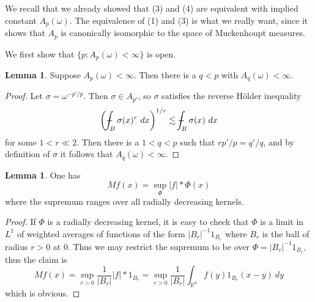 \documentclass[12pt]{book}
\newcommand{\RR}{\mathbb{R}}
\def\Xint#1{\mathchoice
{\XXint\displaystyle\textstyle{#1}}%
{\XXint\textstyle\scriptstyle{#1}}%
{\XXint\scriptstyle\scriptscriptstyle{#1}}%
{\XXint\scriptscriptstyle\scriptscriptstyle{#1}}%
\!\int}
\def\XXint#1#2#3{{\setbox0=\hbox{$#1{#2#3}{\int}$ }
\vcenter{\hbox{$#2#3$ }}\kern-.6\wd0}}
\def\dashint{\Xint-}
\theoremstyle{definition}
\newtheorem{lemma}[theorem]{Lemma}
\begin{document}
We recall that we already showed that (3) and (4) are equivalent with implied constant $A_p(\omega)$.
The equivalence of (1) and (3) is what we really want, since it shows that $A_p$ is canonically isomorphic to the space of Muckenhoupt measures.

We first show that $\{p: A_p(\omega) < \infty\}$ is open.

\begin{lemma}
Suppose $A_p(\omega) < \infty$. Then there is a $q < p$ with $A_q(\omega) < \infty$.
\end{lemma}
\begin{proof}
Let $\sigma = \omega^{-p'/p}$. Then $\sigma \in A_{p'}$, so $\sigma$ satisfies the reverse H\"older inequality
$$\left(\dashint_B \sigma(x)^r ~dx\right)^{1/r} \lesssim \dashint_B \sigma(x) ~dx$$
for some $1 < r \ll 2$. Then there is a $1 < q < p$ such that $rp'/p = q'/q$, and by definition of $\sigma$ it follows that $A_q(\omega) < \infty$.
\end{proof}

\begin{lemma}
\label{Mf is rad dec}
One has
$$Mf(x) = \sup_\Phi |f| * \Phi(x)$$
where the supremum ranges over all radially decreasing kernels.
\end{lemma}
\begin{proof}
If $\Phi$ is a radially decreasing kernel, it is easy to check that $\Phi$ is a limit in $L^1$ of weighted averages of functions of the form $|B_r|^{-1}1_{B_r}$ where $B_r$ is the ball of radius $r > 0$ at $0$.
Thus we may restrict the supremum to be over $\Phi = |B_r|^{-1}1_{B_r}$, thus the claim is
$$Mf(x) = \sup_{r > 0} \frac{1}{|B_r|} |f| * 1_{B_r} = \sup_{r > 0} \frac{1}{|B_r|} \int_{\RR^d} f(y) 1_{B_r}(x - y) ~dy$$
which is obvious.
\end{proof}
\end{document}
